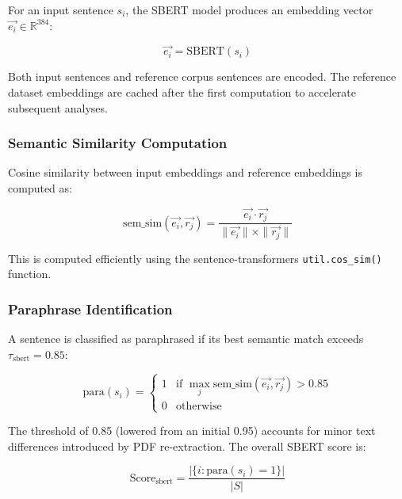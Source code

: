 \documentclass[conference]{IEEEtran}
\begin{document}
For an input sentence $s_i$, the SBERT model produces an embedding vector $\vec{e_i} \in \mathbb{R}^{384}$:

\begin{equation}
\vec{e_i} = \text{SBERT}(s_i)
\label{eq_sbert_embed}
\end{equation}

\noindent Both input sentences and reference corpus sentences are encoded. The reference dataset embeddings are cached after the first computation to accelerate subsequent analyses.

\subsubsection{Semantic Similarity Computation}

Cosine similarity between input embeddings and reference embeddings is computed as:

\begin{equation}
\text{sem\_sim}(\vec{e_i}, \vec{r_j}) = \frac{\vec{e_i} \cdot \vec{r_j}}{\|\vec{e_i}\| \times \|\vec{r_j}\|}
\label{eq_sbert_sim}
\end{equation}

\noindent This is computed efficiently using the sentence-transformers \texttt{util.cos\_sim()} function.

\subsubsection{Paraphrase Identification}

A sentence is classified as paraphrased if its best semantic match exceeds $\tau_{\text{sbert}} = 0.85$:

\begin{equation}
\text{para}(s_i) = \begin{cases} 1 & \text{if } \max_j \text{sem\_sim}(\vec{e_i}, \vec{r_j}) > 0.85 \\ 0 & \text{otherwise} \end{cases}
\label{eq_para}
\end{equation}

\noindent The threshold of 0.85 (lowered from an initial 0.95) accounts for minor text differences introduced by PDF re-extraction. The overall SBERT score is:

\begin{equation}
\text{Score}_{\text{sbert}} = \frac{|\{i : \text{para}(s_i) = 1\}|}{|S|}
\label{eq_sbert_score}
\end{equation}
\end{document}
